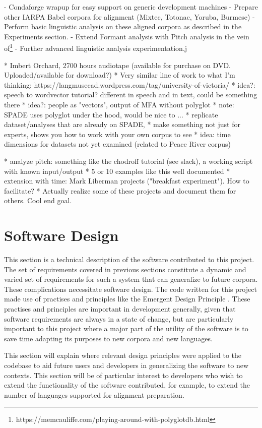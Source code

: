 \documentclass[11pt]{article}
\begin{document}
- Condaforge wrapup for easy support on generic development machines
- Prepare other IARPA Babel corpora for alignment (Mixtec, Totonac, Yoruba, Burmese)
- Perform basic linguistic analysis on these aligned corpora as described in the Experiments section.
- Extend Formant analysis with Pitch analysis in the vein of\footnote{https://memcauliffe.com/playing-around-with-polyglotdb.html}
- Further advanced linguistic analysis experimentation.j

* Imbert Orchard, 2700 hours audiotape (available for purchase on DVD. Uploaded/available for download?)
* Very similar line of work to what I'm thinking: https://langmusecad.wordpress.com/tag/university-of-victoria/ 
* idea?: speech to wordvector tutorial? different in speech and in text, could be something there
* idea?: people as "vectors", output of MFA without polyglot
* note: SPADE uses polyglot under the hood, would be nice to ... 
    * replicate dataset/analyses that are already on SPADE, 
    * make something not just for experts, shows you how to work with your own corpus to see
* idea: time dimensions for datasets not yet examined (related to Peace River corpus)

* analyze pitch: something like the chodroff tutorial (see slack), a working script with known input/output
* 5 or 10 examples like this well documented
* extension with time: Mark Liberman projects ("breakfast experiment"). How to facilitate?
* Actually realize some of these projects and document them for others. Cool end goal.

\section{Software Design}

This section is a technical description of the software contributed to this project. The set of requirements covered in previous sections constitute a dynamic and varied set of requirements for such a system that can generalize to future corpora. These complications necessitate software design. The code written for this project made use of practises and principles like the Emergent Design Principle \cite{bain_emergent_2008}. These practises and principles are important in development generally, given that software requirements are always in a state of change, but are particularly important to this project where a major part of the utility of the software is to save time adapting its purposes to new corpora and new languages. 

This section will explain where relevant design principles were applied to the codebase to aid future users and developers in generalizing the software to new contexts. This section will be of particular interest to developers who wish to extend the functionality of the software contributed, for example, to extend the number of languages supported for alignment preparation.
\end{document}
